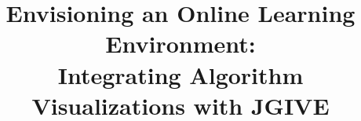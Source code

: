 \documentclass{acm_proc_article-sp}
\begin{document}
\title{Envisioning an Online Learning Environment:
\\ Integrating Algorithm Visualizations with JGIVE}

%
%
%
%
%
\end{document}
